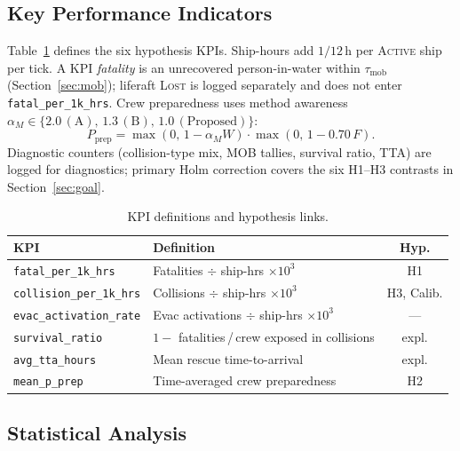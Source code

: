 \documentclass[cameraready]{Interspeech}
\begin{document}
\subsection{Key Performance Indicators}

Table~\ref{tab:kpis} defines the six hypothesis KPIs. Ship-hours add $1/12$\,h per \textsc{Active} ship per tick. A KPI \emph{fatality} is an unrecovered person-in-water within $\tau_{\text{mob}}$ (Section~\ref{sec:mob}); liferaft \textsc{Lost} is logged separately and does not enter \texttt{fatal\_per\_1k\_hrs}. Crew preparedness uses method awareness $\alpha_M \in \{2.0\,(\text{A}),\,1.3\,(\text{B}),\,1.0\,(\text{Proposed})\}$:
\begin{equation*}
  P_{\text{prep}} = \max(0,\,1 - \alpha_M W)\cdot\max(0,\,1 - 0.70\,F).
\end{equation*}
Diagnostic counters (collision-type mix, MOB tallies, survival ratio, TTA) are logged for diagnostics; primary Holm correction covers the six H1--H3 contrasts in Section~\ref{sec:goal}.

\begin{table}[t]
    \caption{KPI definitions and hypothesis links.}
    \label{tab:kpis}
    \centering
    \small
    \setlength{\tabcolsep}{4pt}
    \begin{tabularx}{\columnwidth}{@{}l>{\raggedright\arraybackslash}Xc@{}}
        \toprule
        KPI & Definition & Hyp. \\
        \midrule
        \texttt{fatal\_per\_1k\_hrs}
        & Fatalities $\div$ ship-hrs $\times 10^3$
        & H1 \\
        \texttt{collision\_per\_1k\_hrs}
        & Collisions $\div$ ship-hrs $\times 10^3$
        & H3, Calib. \\
        \texttt{evac\_activation\_rate}
        & Evac activations $\div$ ship-hrs $\times 10^3$
        & --- \\
        \texttt{survival\_ratio}
        & $1 -$ fatalities\,/\,crew exposed in collisions
        & expl. \\
        \texttt{avg\_tta\_hours}
        & Mean rescue time-to-arrival
        & expl. \\
        \texttt{mean\_p\_prep}
        & Time-averaged crew preparedness
        & H2 \\
        \bottomrule
    \end{tabularx}
\end{table}

\subsection{Statistical Analysis}
\label{sec:stats}
\end{document}
